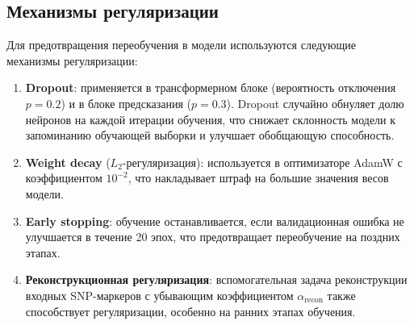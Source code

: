 \subsection{Механизмы регуляризации}

Для предотвращения переобучения в модели используются следующие 
механизмы регуляризации:

\begin{enumerate}
	\item \textbf{Dropout}: применяется в трансформерном блоке 
	(вероятность отключения $p = 0.2$) и в блоке предсказания 
	($p = 0.3$). Dropout случайно обнуляет долю нейронов на 
	каждой итерации обучения, что снижает склонность модели к 
	запоминанию обучающей выборки и улучшает обобщающую способность.
	
	\item \textbf{Weight decay} ($L_2$-регуляризация): используется 
	в оптимизаторе AdamW с коэффициентом $10^{-2}$, что накладывает 
	штраф на большие значения весов модели.
	
	\item \textbf{Early stopping}: обучение останавливается, если 
	валидационная ошибка не улучшается в течение 20 эпох, что 
	предотвращает переобучение на поздних этапах.
	
	\item \textbf{Реконструкционная регуляризация}: вспомогательная 
	задача реконструкции входных SNP-маркеров с убывающим 
	коэффициентом $\alpha_{\text{recon}}$ также способствует 
	регуляризации, особенно на ранних этапах обучения.
\end{enumerate}









